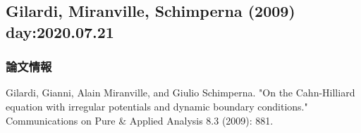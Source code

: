 \documentclass[openary, a4paper, oneside]{jsarticle}
\begin{document}
\newpage

\subsection{Gilardi, Miranville, Schimperna (2009) \cite{GilardiMiranvilleSchimperna2009} day:2020.07.21}
	\subsubsection{論文情報}
	Gilardi, Gianni, Alain Miranville, and Giulio Schimperna. "On the Cahn-Hilliard equation with irregular potentials and dynamic boundary conditions." Communications on Pure \& Applied Analysis 8.3 (2009): 881.
\end{document}
